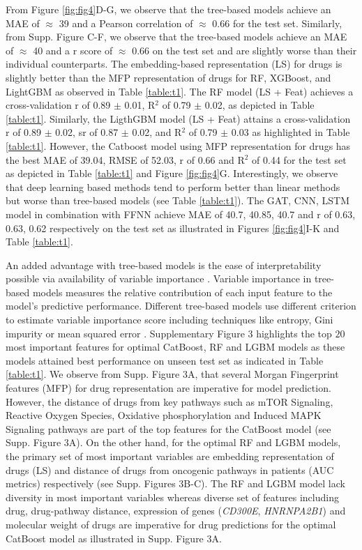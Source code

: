 \documentclass[pdflatex,sn-mathphys-num]{sn-jnl}%
\theoremstyle{thmstyleone}%
\theoremstyle{thmstyletwo}%
\theoremstyle{thmstylethree}%
\begin{document}
From Figure \ref{fig:fig4}D-G, we observe that the tree-based models achieve an MAE of $\approx$ 39 and a Pearson correlation of $\approx$ 0.66 for the test set. Similarly, from Supp. Figure C-F, we observe that the tree-based models achieve an MAE of $\approx$ 40 and a r score of $\approx$ 0.66 on the test set and are slightly worse than their individual counterparts. The embedding-based representation (LS) for drugs is slightly better than the MFP representation of drugs for RF, XGBoost, and LightGBM as observed in Table \ref{table:t1}. The RF model (LS + Feat) achieves a cross-validation r of 0.89 $\pm$ 0.01, R$^2$ of 0.79 $\pm$ 0.02, as depicted in Table \ref{table:t1}. Similarly, the LigthGBM model (LS + Feat) attains a cross-validation r of 0.89 $\pm$ 0.02, sr of 0.87 $\pm$ 0.02, and R$^2$ of 0.79 $\pm$ 0.03 as highlighted in Table \ref{table:t1}. However, the Catboost model using MFP representation for drugs has the best MAE of 39.04, RMSE of 52.03, r of 0.66 and R$^2$ of 0.44 for the test set as depicted in Table \ref{table:t1} and Figure \ref{fig:fig4}G. Interestingly, we observe that deep learning based methods tend to perform better than linear methods but worse than tree-based models (see Table \ref{table:t1}). The GAT, CNN, LSTM model in combination with FFNN achieve MAE of 40.7, 40.85, 40.7 and r of 0.63, 0.63, 0.62 respectively on the test set as illustrated in Figures \ref{fig:fig4}I-K and Table \ref{table:t1}. 

An added advantage with tree-based models is the ease of interpretability possible via availability of variable importance \cite{mall2018rgbm}. Variable importance in tree-based models measures the relative contribution of each input feature to the model's predictive performance. Different tree-based models use different criterion to estimate variable importance score including techniques like entropy, Gini impurity or mean squared error \cite{louppe2013understanding}. Supplementary Figure 3 highlights the top $20$ most important features for optimal CatBoost, RF and LGBM models as these models attained best performance on unseen test set as indicated in Table \ref{table:t1}. We observe from Supp. Figure 3A, that several Morgan Fingerprint features (MFP) for drug representation are imperative for model prediction. However, the distance of drugs from key pathways such as mTOR Signaling, Reactive Oxygen Species, Oxidative phosphorylation and Induced MAPK Signaling pathways are part of the top features for the CatBoost model (see Supp. Figure 3A). On the other hand, for the optimal RF and LGBM models, the primary set of most important variables are embedding representation of drugs (LS) and distance of drugs from oncogenic pathways in patients (AUC metrics) respectively (see Supp. Figures 3B-C). The RF and LGBM model lack diversity in most important variables whereas diverse set of features including drug, drug-pathway distance, expression of genes (\textit{CD300E}, \textit{HNRNPA2B1}) and molecular weight of drugs are imperative for drug predictions for the optimal CatBoost model as illustrated in Supp. Figure 3A.
\end{document}

